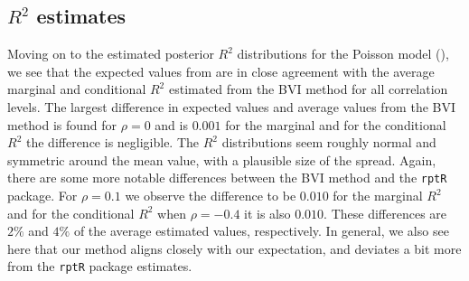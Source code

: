 \subsection{\texorpdfstring{$R^2$}{Lg} estimates}
Moving on to the estimated posterior $R^2$ distributions for the Poisson model (), we see that the expected values from  are in close agreement with the average marginal and conditional $R^2$ estimated from the BVI method for all correlation levels. The largest difference in expected values and average values from the BVI method is found for $\rho=0$ and is $0.001$ for the marginal and for the conditional $R^2$ the difference is negligible. The $R^2$ distributions seem roughly normal and symmetric around the mean value, with a plausible size of the spread. Again, there are some more notable differences between the BVI method and the \texttt{rptR} package. For $\rho=0.1$ we observe the difference to be $0.010$ for the marginal $R^2$ and for the conditional $R^2$ when $\rho=-0.4$ it is also $0.010$. These differences are $2\%$ and $4\%$ of the average estimated values, respectively. In general, we also see here that our method aligns closely with our expectation, and deviates a bit more from the \texttt{rptR} package estimates.

